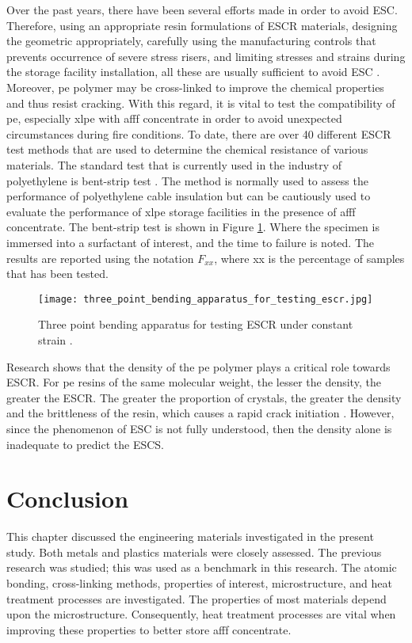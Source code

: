 Over the past years, there have been several efforts made in order to avoid ESC. Therefore, using an appropriate resin formulations of ESCR materials, designing the geometric appropriately, carefully using the manufacturing controls that prevents occurrence of severe stress risers, and limiting stresses and strains during the storage facility installation, all these are usually sufficient to avoid ESC \cite{gabriel1998history}. Moreover, \acrshort{pe} polymer may be cross-linked to improve the chemical properties and thus resist cracking.  With this regard, it is vital to test the compatibility of \acrshort{pe}, especially \acrshort{xlpe} with \acrshort{afff} concentrate in order to avoid unexpected circumstances during fire conditions. To date, there are over 40 different ESCR test methods that are used to determine the chemical resistance of various materials. The standard test that is currently used in the industry of polyethylene is bent-strip test \cite{gabriel1998history}. The method is normally used to assess the performance of polyethylene cable insulation but can be cautiously used to evaluate the performance of \acrshort{xlpe} storage facilities in the presence of \acrshort{afff} concentrate. The bent-strip test is shown in Figure \ref{ch3:figure:bending_apparatus}. Where the specimen is immersed into a surfactant of interest, and the time to failure is noted. The results are reported using the notation $F_{xx}$, where xx is the percentage of samples that has been tested.
 
\begin{figure}[H]
    \centering
    \texttt{[image: three\_point\_bending\_apparatus\_for\_testing\_escr.jpg]}
    \caption{Three point bending apparatus for testing ESCR under constant strain \cite{choi2009modeling}.}
    \label{ch3:figure:bending_apparatus}
\end{figure}

Research shows that the density of the \acrshort{pe} polymer plays a critical role towards ESCR. For \acrshort{pe} resins of the same molecular weight, the lesser the density, the greater the ESCR. The greater the proportion of crystals, the greater the density and the brittleness of the resin, which causes a rapid crack initiation \cite{gabriel1998history}. However, since the phenomenon of ESC is not fully understood, then the density alone is inadequate to predict the ESCS.

\section{Conclusion}
This chapter discussed the engineering materials investigated in the present study. Both metals and plastics materials were closely assessed. The previous research was studied; this was used as a benchmark in this research. The atomic bonding, cross-linking methods, properties of interest, microstructure, and heat treatment processes are investigated. The properties of most materials depend upon the microstructure. Consequently, heat treatment processes are vital when improving these properties to better store \acrshort{afff} concentrate.

